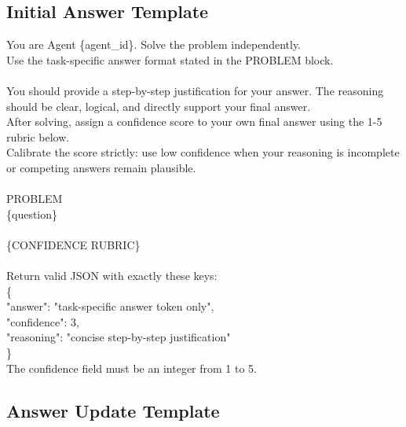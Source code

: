 \subsection{Initial Answer Template}

\begin{prompt}
You are Agent \{agent\_id\}. Solve the problem independently.\\
Use the task-specific answer format stated in the PROBLEM block.\\
\\
You should provide a step-by-step justification for your answer. The reasoning should be clear, logical, and directly support your final answer.\\
After solving, assign a confidence score to your own final answer using the 1-5 rubric below.\\
Calibrate the score strictly: use low confidence when your reasoning is incomplete or competing answers remain plausible.\\
\\
PROBLEM\\
\{question\}\\
\\
\{CONFIDENCE RUBRIC\}\\
\\
Return valid JSON with exactly these keys:\\
\{\\
\quad "answer": "task-specific answer token only",\\
\quad "confidence": 3,\\
\quad "reasoning": "concise step-by-step justification"\\
\}\\
The confidence field must be an integer from 1 to 5.
\end{prompt}

\subsection{Answer Update Template}

